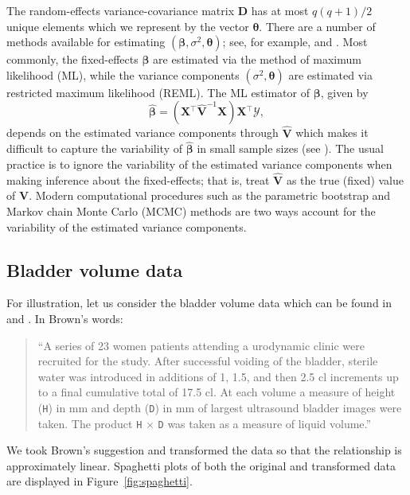\documentclass{article}\usepackage[]{graphicx}\usepackage[]{color}
\newcommand{\trans}{\ensuremath{^\top}}
\begin{document}
The random-effects variance-covariance matrix $\bm{D}$ has at most $q(q+1)/2$ unique elements which we represent by the vector $\bm{\theta}$.  There are a number of methods available for estimating $\left( \bm{\beta}, \sigma^2, \bm{\theta} \right)$; see, for example, \citet[chap 6.]{mcculloch_generalized_2008} and \citet[chap. 2]{demidenko_mixed_2013}.  Most commonly, the fixed-effects $\bm{\beta}$ are estimated via the method of maximum likelihood (ML), while the variance components $\left(\sigma^2, \bm{\theta}\right)$ are estimated via restricted maximum likelihood (REML).  The ML estimator of $\bm{\beta}$, given by
\begin{equation*}
\widehat{\bm{\beta}} = \left( \bm{X}\trans \widehat{\bm{V}}^{-1} \bm{X} \right)\bm{X}\trans\bm{\mathcal{Y}},
\end{equation*}
depends on the estimated variance components through $\widehat{\bm{V}}$ which makes it difficult to capture the variability of $\widehat{\bm{\beta}}$ in small sample sizes (see \citet[pp. 165-167]{mcculloch_generalized_2008}).  The usual practice is to ignore the variability of the estimated variance components when making inference about the fixed-effects; that is, treat $\widehat{\bm{V}}$ as the true (fixed) value of $\bm{V}$.  Modern computational procedures such as the parametric bootstrap and Markov chain Monte Carlo (MCMC) methods are two ways account for the variability of the estimated variance components.


\subsection{Bladder volume data}

For illustration, let us consider the bladder volume data which can be found in \citet[pg. 7]{brown-measurement-1993} and \citet{oman-calibration-1998}.  In Brown's words:
\begin{quotation}
\noindent``A series of 23 women patients attending a urodynamic clinic were recruited for the study. After successful voiding of the bladder, sterile water was introduced in additions of 1, 1.5, and then 2.5 cl increments up to a final cumulative total of 17.5 cl. At each volume a measure of height (\texttt{H}) in mm and depth (\texttt{D}) in mm of largest ultrasound bladder images were taken. The product \texttt{H} $\times$ \texttt{D} was taken as a measure of liquid volume.''
\end{quotation}
We took Brown's suggestion and transformed the data so that the relationship is approximately linear.  Spaghetti plots of both the original and transformed data are displayed in Figure~\ref{fig:spaghetti}.
\end{document}
